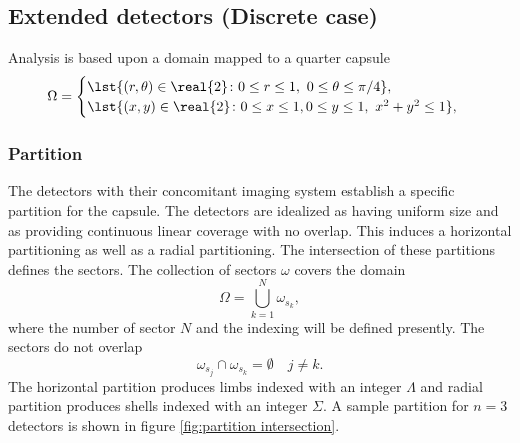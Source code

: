 \documentclass[final,leqno,onefignum,onetabnum]{siamltex1213}
\begin{document}
\subsection{\label{ssec:extended}Extended detectors (Discrete case)}
Analysis is based upon a domain mapped to a quarter capsule
  \begin{equation}
    \Omega = 
      \begin{cases}
        \lst{(r,\theta)\in\real{2}\colon 0\le r \le 1,\ 0\le \theta \le \pi / 4}, \\
        \lst{(x,y)\in\real{2}\colon 0\le x \le 1, 0\le y \le 1,\ x^{2} + y^{2} \le 1}, \\
      \end{cases}
  \end{equation}

\subsubsection{Partition}
The detectors with their concomitant imaging system establish a specific partition for the capsule. The detectors are idealized as having uniform size and as providing continuous linear coverage with no overlap. This induces a horizontal partitioning as well as a radial partitioning. The intersection of these partitions defines the sectors. The collection of sectors $\omega$ covers the domain
  \begin{equation}
    \Omega = \bigcup_{k=1}^{N} \omega_{s_{k}},
  \end{equation}
where the number of sector $N$ and the indexing will be defined presently. The sectors do not overlap
  \begin{equation}
    \omega_{s_{j}} \cap \omega_{s_{k}} = \emptyset \quad j\ne k.
  \end{equation}
The horizontal partition produces limbs indexed with an integer $\Lambda$ and radial partition produces shells indexed with an integer $\Sigma$. A sample partition for $n=3$ detectors is shown in figure \eqref{fig:partition intersection}.

\begin{figure}
  \centering
\end{figure}
\end{document}
